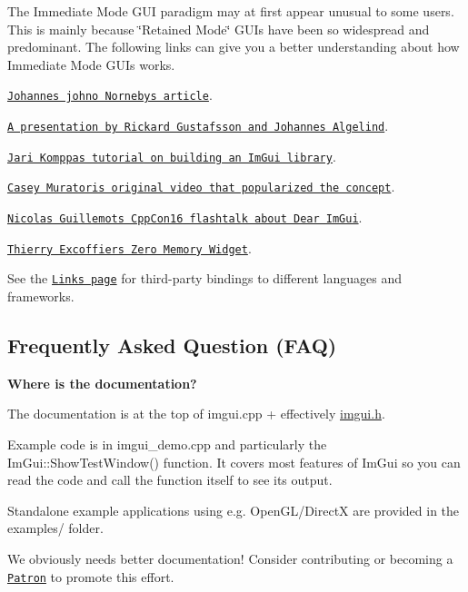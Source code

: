 The Immediate Mode G\+UI paradigm may at first appear unusual to some users. This is mainly because \char`\"{}\+Retained Mode\char`\"{} G\+U\+Is have been so widespread and predominant. The following links can give you a better understanding about how Immediate Mode G\+U\+Is works.
\begin{DoxyItemize}
\item \href{http://www.johno.se/book/imgui.html}{\tt Johannes \textquotesingle{}johno\textquotesingle{} Norneby\textquotesingle{}s article}.
\item \href{http://www.cse.chalmers.se/edu/year/2011/course/TDA361/Advanced%20Computer%20Graphics/IMGUI.pdf}{\tt A presentation by Rickard Gustafsson and Johannes Algelind}.
\item \href{http://iki.fi/sol/imgui/}{\tt Jari Komppa\textquotesingle{}s tutorial on building an Im\+Gui library}.
\item \href{https://mollyrocket.com/861}{\tt Casey Muratori\textquotesingle{}s original video that popularized the concept}.
\item \href{https://www.youtube.com/watch?v=LSRJ1jZq90k}{\tt Nicolas Guillemot\textquotesingle{}s Cpp\+Con\textquotesingle{}16 flashtalk about Dear Im\+Gui}.
\item \href{http://perso.univ-lyon1.fr/thierry.excoffier/ZMW/}{\tt Thierry Excoffier\textquotesingle{}s Zero Memory Widget}.
\end{DoxyItemize}

See the \href{https://github.com/ocornut/imgui/wiki/Links}{\tt Links page} for third-\/party bindings to different languages and frameworks.

\subsection*{Frequently Asked Question (F\+AQ) }

{\bfseries Where is the documentation?}


\begin{DoxyItemize}
\item The documentation is at the top of imgui.\+cpp + effectively \hyperlink{imgui_8h_source}{imgui.\+h}.
\item Example code is in imgui\+\_\+demo.\+cpp and particularly the Im\+Gui\+::\+Show\+Test\+Window() function. It covers most features of Im\+Gui so you can read the code and call the function itself to see its output.
\item Standalone example applications using e.\+g. Open\+G\+L/\+DirectX are provided in the examples/ folder.
\item We obviously needs better documentation! Consider contributing or becoming a \href{http://www.patreon.com/imgui}{\tt Patron} to promote this effort.
\end{DoxyItemize}

